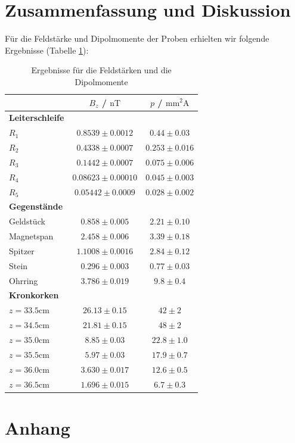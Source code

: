 \documentclass[12pt]{article}
\begin{document}
\section{Zusammenfassung und Diskussion \label{Diskussion}}
Für die Feldstärke und Dipolmomente der Proben erhielten wir folgende Ergebnisse (Tabelle \ref{ergebnisse}):
\begin{table}[h!]
	\centering
	\begin{tabular}{l|c|c}
		&$B_z$ / $\mathrm{nT}$&$p$ / $\mathrm{mm^2A}$\\\hline\hline
		\textbf{Leiterschleife}&&\\\hline
		$R_1$&$0.8539\pm0.0012$&$0.44\pm0.03$\\\hline
		$R_2$&$0.4338\pm0.0007$&$0.253\pm0.016$\\\hline
		$R_3$&$0.1442\pm0.0007$&$0.075\pm0.006$\\\hline
		$R_4$&$0.08623\pm0.00010$&$0.045\pm0.003$\\\hline
		$R_5$&$0.05442\pm0.0009$&$0.028\pm0.002$\\\hline\hline
		\textbf{Gegenstände}&&\\\hline
		Geldstück&$0.858\pm0.005$&$2.21\pm0.10$\\\hline
		Magnetspan&$2.458\pm0.006$&$3.39\pm0.18$\\\hline
		Spitzer&$1.1008\pm0.0016$&$2.84\pm0.12$\\\hline
		Stein&$0.296\pm0.003$&$0.77\pm0.03$\\\hline
		Ohrring&$3.786\pm0.019$&$9.8\pm0.4$\\\hline\hline
		\textbf{Kronkorken}&&\\\hline
		$z=33.5\mathrm{cm}$&$26.13 \pm0.15 $&$42  \pm2  $\\\hline
		$z=34.5\mathrm{cm}$&$21.81 \pm0.15 $&$48  \pm2  $\\\hline
		$z=35.0\mathrm{cm}$&$ 8.85 \pm0.03 $&$22.8\pm1.0$\\\hline
		$z=35.5\mathrm{cm}$&$ 5.97 \pm0.03 $&$17.9\pm0.7$\\\hline
		$z=36.0\mathrm{cm}$&$ 3.630\pm0.017$&$12.6\pm0.5$\\\hline
		$z=36.5\mathrm{cm}$&$ 1.696\pm0.015$&$ 6.7\pm0.3$
	\end{tabular}
	\caption{Ergebnisse für die Feldstärken und die Dipolmomente\label{ergebnisse}}
\end{table}

\newpage
\section{Anhang}
\end{document}
